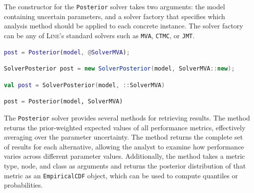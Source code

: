 The constructor for the \texttt{Posterior} solver takes two arguments: the model containing uncertain parameters, and a solver factory that specifies which analysis method should be applied to each concrete instance. The solver factory can be any of \textsc{Line}'s standard solvers such as \texttt{MVA}, \texttt{CTMC}, or \texttt{JMT}.

\begin{MATLAB}
\begin{lstlisting}[language = matlab]
post = Posterior(model, @SolverMVA);
\end{lstlisting}
\end{MATLAB}
\begin{JAVA}
\begin{lstlisting}[language=java, basicstyle=\ttfamily\scriptsize]
SolverPosterior post = new SolverPosterior(model, SolverMVA::new);
\end{lstlisting}
\end{JAVA}
\begin{KOTLIN}
\begin{lstlisting}[language=kotlin, basicstyle=\ttfamily\scriptsize]
val post = SolverPosterior(model, ::SolverMVA)
\end{lstlisting}
\end{KOTLIN}
\begin{PYTHON}
\begin{lstlisting}[language=python]
post = Posterior(model, SolverMVA)
\end{lstlisting}
\end{PYTHON}

The \texttt{Posterior} solver provides several methods for retrieving results. The  method returns the prior-weighted expected values of all performance metrics, effectively averaging over the parameter uncertainty. The  method returns the complete set of results for each alternative, allowing the analyst to examine how performance varies across different parameter values. Additionally, the  method takes a metric type, node, and class as arguments and returns the posterior distribution of that metric as an \texttt{EmpiricalCDF} object, which can be used to compute quantiles or probabilities.

